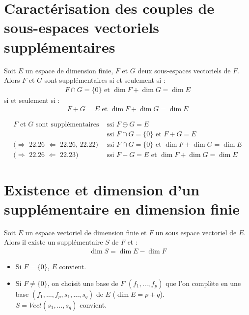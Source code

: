 \documentclass[../main.tex]{subfiles}
\begin{document}
\section{Caractérisation des couples de sous-espaces vectoriels supplémentaires}
\begin{tcolorbox}[title=Propostion 22.27, title filled=false, colframe=lightblue, colback=lightblue!10!white]
    Soit $E$ un espace de dimension finie, $F$ et $G$ deux sous-espaces vectoriels de $F$. Alors $F$ et $G$ sont supplémentaires si et seulement si : 
    \begin{align*}
        F \cap G = \{0\} \text{ et } \dim F + \dim G = \dim E
    \end{align*}
    si et seulement si : 
    \begin{align*}
        F + G = E \text{ et } \dim F + \dim G = \dim E
    \end{align*}
\end{tcolorbox}

\begin{align*}
    F \text{ et } G \text{ sont supplémentaires} &\text{ ssi } F \oplus G = E \\
    &\text{ ssi } F \cap G = \{0\} \text{ et } F + G = E \\
    \text{(} \boxed{\Rightarrow} \text{ 22.26 } \boxed{\Leftarrow} \text{ 22.26, 22.22} \text{)} &\text{ ssi } F \cap G = \{0\} \text{ et } \dim F + \dim G = \dim E \\
    \text{(} \boxed{\Rightarrow} \text{ 22.26 } \boxed{\Leftarrow} \text{ 22.23} \text{)} &\text{ ssi } F + G = E \text{ et } \dim F + \dim G = \dim E
\end{align*}

\section{Existence et dimension d'un supplémentaire en dimension finie}
\begin{tcolorbox}[title=Théorème 22.28, title filled=false, colframe=orange, colback=orange!10!white]
    Soit $E$ un espace vectoriel de dimension finie et $F$ un sous espace vectoriel de $E$. Alors il existe un supplémentaire $S$ de $F$ et : 
    \begin{align*}
        \dim S = \dim E - \dim F
    \end{align*}
\end{tcolorbox}

\begin{itemize}
    \item Si $F = \{0\}$, $E$ convient. 
    \item Si $F \neq \{0\}$, on choisit une base de $F$ $(f_1, \ldots, f_p)$ que l'on complète en une base $(f_1, \ldots, f_p, s_1, \ldots, s_q)$ de $E$ ($\dim E = p+q$). \\
    $S = Vect(s_1, \ldots, s_q)$ convient. 
\end{itemize}
\end{document}
